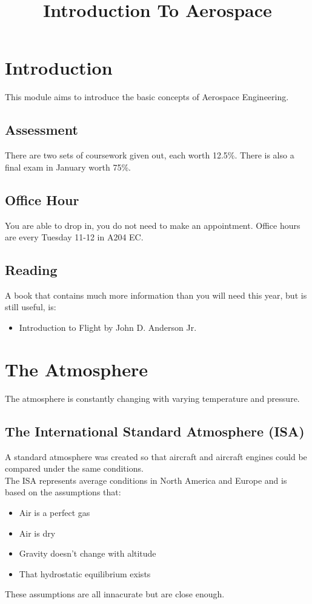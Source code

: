 \documentclass[12pt,a4paper]{article}
\begin{document}
\title{Introduction To Aerospace}
\date{}
\maketitle

\newpage

\tableofcontents

\newpage

\section{Introduction}
	
	This module aims to introduce the basic concepts of Aerospace Engineering.

	\subsection{Assessment}
		There are two sets of coursework given out, each worth 12.5\%. There is also a final exam in January worth 75\%.
		
	\subsection{Office Hour}
		You are able to drop in, you do not need to make an appointment. Office hours are every Tuesday 11-12 in A204 EC.
		
	\subsection{Reading}
		A book that contains much more information than you will need this year, but is still useful, is:
		\begin{itemize}
			\item Introduction to Flight by John D. Anderson Jr.
		\end{itemize}
		
\newpage

\section{The Atmosphere}
	The atmosphere is constantly changing with varying temperature and pressure.
	
	\subsection{The International Standard Atmosphere (ISA)}
		A standard atmosphere was created so that aircraft and aircraft engines could be compared under the same conditions. \\
		The ISA represents average conditions in North America and Europe and is based on the assumptions that:
		\begin{itemize}
			\item Air is a perfect gas
			\item Air is dry
			\item Gravity doesn't change with altitude
			\item That hydrostatic equilibrium exists
		\end{itemize}
		These assumptions are all innacurate but are close enough.
		
\end{document}
